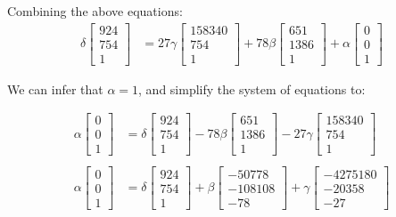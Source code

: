 \documentclass[12pt, oneside]{article}
\begin{document}
    Combining the above equations:
    \begin{align*}
    \delta  \begin{bmatrix} 924   \\ 754   \\ 1   \end{bmatrix}  &= 
    27 \gamma  \begin{bmatrix} 158340  \\ 754 \\ 1  \end{bmatrix} + 
    78\beta \begin{bmatrix} 651   \\ 1386 \\   1   \end{bmatrix} + 
    \alpha \begin{bmatrix} 0   \\ 0   \\   1   \end{bmatrix} 
    \end{align*} 
  
    We can infer that $\alpha = 1$, and simplify the system of equations to:
    
  \begin{align*}
  \alpha  \begin{bmatrix} 0  \\ 0   \\ 1   \end{bmatrix} &= 
  \delta  \begin{bmatrix} 924   \\ 754   \\ 1   \end{bmatrix}  -
  78\beta \begin{bmatrix} 651   \\ 1386	\\   1   \end{bmatrix}
  - 27 \gamma  \begin{bmatrix} 158340  \\ 754 \\ 1  \end{bmatrix}\\ \\ 
  \alpha  \begin{bmatrix} 0  \\ 0   \\ 1   \end{bmatrix} &= 
  \delta  \begin{bmatrix} 924   \\ 754   \\ 1   \end{bmatrix}  +
  \beta \begin{bmatrix} -50778  \\ -108108   \\ -78   \end{bmatrix} +
  \gamma  \begin{bmatrix} -4275180  \\ -20358 \\ -27 \end{bmatrix} 
  \end{align*} 
  
\end{document}
